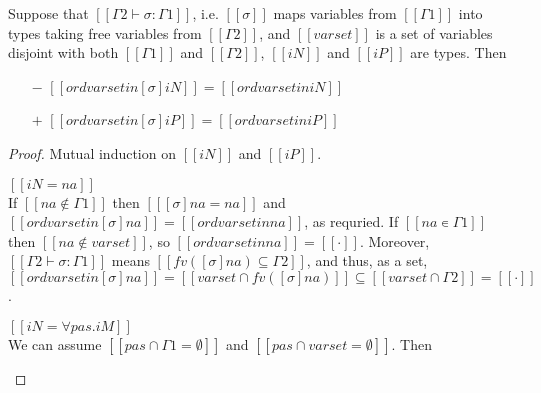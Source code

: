 \begin{lemma}
  \label{lemma:ord-sigma}
  Suppose that $[[Γ2 ⊢ σ : Γ1]]$, i.e. $[[σ]]$ maps variables from $[[Γ1]]$ into types
  taking free variables from $[[Γ2]]$, and $[[varset]]$ is a set of variables
  disjoint with both $[[Γ1]]$ and $[[Γ2]]$, 
  $[[iN]]$ and $[[iP]]$ are types. Then
    \begin{itemize}
  \item[$-$] $[[ ord varset in [σ]iN ]] = [[ord varset in iN ]]$
  \item[$+$] $[[ ord varset in [σ]iP ]] = [[ord varset in iP ]]$
  \end{itemize}
\end{lemma}
\begin{proof}
  Mutual induction on $[[iN]]$ and $[[iP]]$.
  \begin{caseof}
    \item $[[iN = na]]$ \\
      If $[[na ∉ Γ1]]$ then $[[ [σ]na = na ]]$ and $[[ ord varset in [σ]na ]] = [[ ord varset in na ]]$, 
      as requried.
      If $[[na ∊ Γ1]]$ then $[[na ∉ varset]]$, so $[[ ord varset in na ]] = [[·]]$.
      Moreover, $[[Γ2 ⊢ σ : Γ1]]$ means $[[ fv([σ]na) ⊆ Γ2 ]]$, and thus, 
      as a set, $[[ ord varset in [σ]na ]] = [[varset ∩ fv([σ]na)]] \subseteq [[varset ∩ Γ2]] = [[·]]$.
    \item $[[iN = ∀pas.iM]]$\\
      We can assume $[[{pas} ∩ Γ1 = ∅]]$
      and $[[{pas} ∩ varset = ∅]]$. Then 


\end{caseof}
\end{proof}

